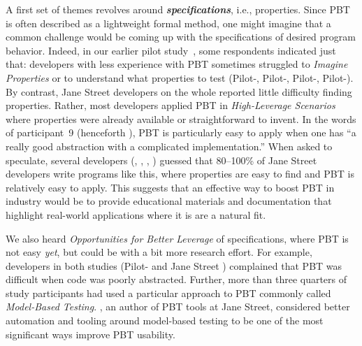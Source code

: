 \ifthemecolors{}\fi
\newcommand{\proptheme}[1]{{\ifthemecolors\color{nord-orange}\fi \em #1}}
\newcommand{\gentheme}[1]{{\ifthemecolors\color{nord-green}\fi \em #1}}
\newcommand{\evaltheme}[1]{{\ifthemecolors\color{nord-purple}\fi \em #1}}
\newcommand{\edutheme}[1]{{\ifthemecolors\color{nord-frost4}\fi \em #1}}
A first set of
themes revolves around \proptheme{\normalfont \bf specifications}, i.e.,
properties.
Since
PBT is often described as a lightweight formal method, one
might imagine that a common challenge would be coming up with the
specifications of desired program behavior. Indeed, in our earlier pilot
study~\cite{goldstein_problems_2022}, some respondents indicated just that:
developers with less experience with PBT
sometimes struggled to \proptheme{Imagine
Properties} or to understand what properties to test (Pilot-,
Pilot-,
Pilot-, Pilot-).
By contrast, Jane Street developers on the whole reported
little difficulty finding
properties. Rather, most developers applied PBT in
\proptheme{High-Leverage Scenarios} where properties were already
available or straightforward to invent. In the words of participant~9
(henceforth ), PBT is particularly easy to apply when
one has ``a really good abstraction with a complicated implementation.''
When asked to speculate, several developers (, ,
, ) guessed
that 80--100\% of Jane Street
developers write programs like this, where properties are easy to find and
PBT is relatively easy to apply. This suggests that an effective way to
boost PBT in industry would be to provide
educational materials and documentation that highlight
real-world applications where it is are a natural
fit. \iflater{}\fi

We also heard \proptheme{Opportunities for Better
Leverage} of specifications, where PBT is not easy {\em yet}, but
could be with a bit more research effort. For example, developers in
both studies (Pilot- and Jane Street ) complained
that PBT was difficult when code was poorly abstracted.  Further,
more than three
quarters of study participants had used a particular approach to PBT commonly
called \proptheme{Model-Based Testing}.  , an author of PBT tools
at Jane Street, considered better automation and tooling around model-based
testing to be one of the most significant ways improve PBT usability.

